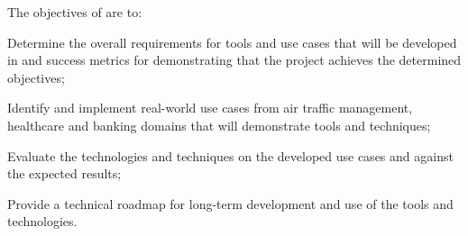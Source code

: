 \addtocounter{wpno}{1}
\begin{Workpackage}{\thewpno}
\WPTitle{\wpname{\thewpno}}



\begin{WPObjectives}
The objectives of \theWP{} are to:
\begin{compactitem}
\item	Determine the overall requirements for tools and use cases that will be developed in \TheProject{} and success metrics for demonstrating that the project achieves the determined objectives;
\item	Identify and implement real-world use cases from air traffic management, healthcare and banking domains that will demonstrate \TheProject{} tools and techniques;
\item	Evaluate the \TheProject{} technologies and techniques on the developed use cases and against the expected results;
\item	Provide a technical roadmap for long-term development and use of the \TheProject tools and technologies.
\end{compactitem}
\end{WPObjectives}


\end{Workpackage}
